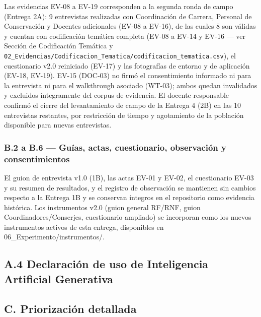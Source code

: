 Las evidencias EV-08 a EV-19 corresponden a la segunda ronda de campo (Entrega 2A): 9 entrevistas realizadas con Coordinación de Carrera, Personal de Conservación y Docentes adicionales (EV-08 a EV-16), de las cuales 8 son válidas y cuentan con codificación temática completa (EV-08 a EV-14 y EV-16 --- ver Sección de Codificación Temática y \nolinkurl{02_Evidencias/Codificacion_Tematica/codificacion_tematica.csv}), el cuestionario v2.0 reiniciado (EV-17) y las fotografías de entorno y de aplicación (EV-18, EV-19). EV-15 (DOC-03) no firmó el consentimiento informado ni para la entrevista ni para el walkthrough asociado (WT-03); ambos quedan invalidados y excluidos íntegramente del corpus de evidencia. El docente responsable confirmó el cierre del levantamiento de campo de la Entrega 4 (2B) en las 10 entrevistas restantes, por restricción de tiempo y agotamiento de la población disponible para nuevas entrevistas.


\subsubsection*{B.2 a B.6 --- Guías, actas, cuestionario, observación y consentimientos}


El guion de entrevista v1.0 (1B), las actas EV-01 y EV-02, el cuestionario EV-03 y su resumen de resultados, y el registro de observación se mantienen sin cambios respecto a la Entrega 1B y se conservan íntegros en el repositorio como evidencia histórica. Los instrumentos v2.0 (guion general RF/RNF, guion Coordinadores/Conserjes, cuestionario ampliado) se incorporan como los nuevos instrumentos activos de esta entrega, disponibles en 06\_Experimento/instrumentos/.


\subsection*{A.4 Declaración de uso de Inteligencia Artificial Generativa}


\subsection*{C. Priorización detallada}


